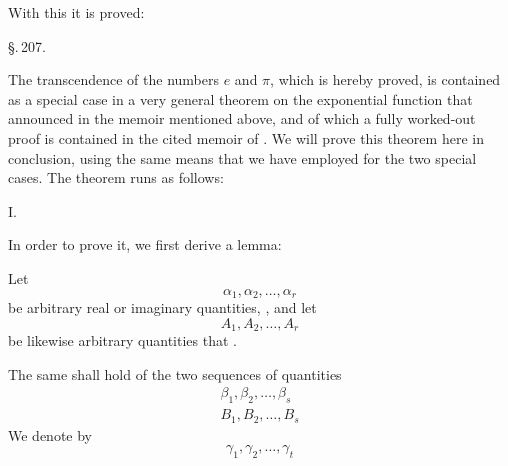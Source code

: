 
With this it is proved:


\begin{center}
\S.\,207.

\end{center}

The transcendence of the numbers $e$ and $\pi$, which is hereby proved, is contained as a special case in a very general theorem on the exponential function that  announced in the memoir mentioned above, and of which a fully worked-out proof is contained in the cited memoir of . We will prove this theorem here in conclusion, using the same means that we have employed for the two special cases. The theorem runs as follows:

I.   

In order to prove it, we first derive a lemma:

Let
\[
\alpha_1,\alpha_2,\ldots,\alpha_r
\]
be arbitrary real or imaginary quantities, , and let
\[
A_1,A_2,\ldots,A_r
\]
be likewise arbitrary quantities that .

The same shall hold of the two sequences of quantities
\[
\begin{gathered}
\beta_1,\beta_2,\ldots,\beta_s \\
B_1,B_2,\ldots,B_s
\end{gathered}
\]
We denote by
\[
\gamma_1,\gamma_2,\ldots,\gamma_t
\]

